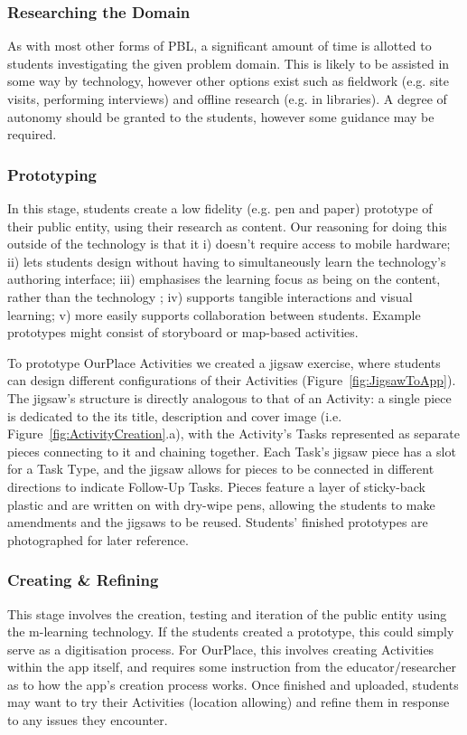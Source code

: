 \documentclass[,hyphens]{sigchi}
\begin{document}
\subsubsection{Researching the Domain}
As with most other forms of PBL, a significant amount of time is allotted to students investigating the given problem domain. This is likely to be assisted in some way by technology, however other options exist such as fieldwork (e.g. site visits, performing interviews) and offline research (e.g. in libraries). A degree of autonomy should be granted to the students, however some guidance may be required.

\subsubsection{Prototyping}
In this stage, students create a low fidelity (e.g. pen and paper) prototype of their public entity, using their research as content. Our reasoning for doing this outside of the technology is that it i) doesn't require access to mobile hardware; ii) lets students design without having to simultaneously learn the technology's authoring interface; iii) emphasises the learning focus as being on the content, rather than the technology \cite{Bell2010}; iv) supports tangible interactions and visual learning; v) more easily supports collaboration between students. Example prototypes might consist of storyboard or map-based activities.

To prototype OurPlace Activities we created a jigsaw exercise, where students can design different configurations of their Activities (Figure~\ref{fig:JigsawToApp}). The jigsaw's structure is directly analogous to that of an Activity: a single piece is dedicated to the its title, description and cover image (i.e. Figure~\ref{fig:ActivityCreation}.a), with the Activity's Tasks represented as separate pieces connecting to it and chaining together. Each Task's jigsaw piece has a slot for a Task Type, and the jigsaw allows for pieces to be connected in different directions to indicate Follow-Up Tasks. Pieces feature a layer of sticky-back plastic and are written on with dry-wipe pens, allowing the students to make amendments and the jigsaws to be reused. Students' finished prototypes are photographed for later reference.

\subsubsection{Creating \& Refining}
This stage involves the creation, testing and iteration of the public entity using the m-learning technology. If the students created a prototype, this could simply serve as a digitisation process. For OurPlace, this involves creating Activities within the app itself, and requires some instruction from the educator/researcher as to how the app's creation process works. Once finished and uploaded, students may want to try their Activities (location allowing) and refine them in response to any issues they encounter. 
\end{document}
